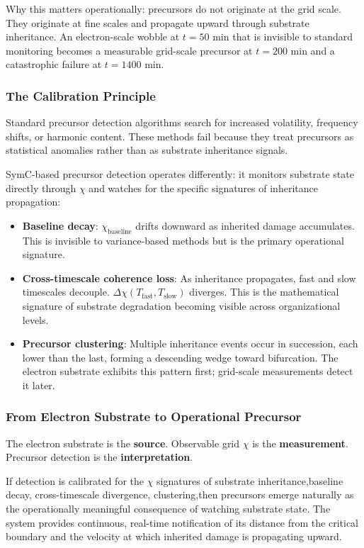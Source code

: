 \documentclass[11pt,letterpaper]{article}
\begin{document}
Why this matters operationally: precursors do not originate at the grid scale. They originate at fine scales and propagate upward through substrate inheritance. An electron-scale wobble at $t = 50$ min that is invisible to standard monitoring becomes a measurable grid-scale precursor at $t = 200$ min and a catastrophic failure at $t = 1400$ min.

\subsubsection{The Calibration Principle}

Standard precursor detection algorithms search for increased volatility, frequency shifts, or harmonic content. These methods fail because they treat precursors as statistical anomalies rather than as substrate inheritance signals.

SymC-based precursor detection operates differently: it monitors substrate state directly through $\chi$ and watches for the specific signatures of inheritance propagation:

\begin{itemize}
\item \textbf{Baseline decay}: $\chi_{\text{baseline}}$ drifts downward as inherited damage accumulates. This is invisible to variance-based methods but is the primary operational signature.
\item \textbf{Cross-timescale coherence loss}: As inheritance propagates, fast and slow timescales decouple. $\Delta\chi(T_{\text{fast}}, T_{\text{slow}})$ diverges. This is the mathematical signature of substrate degradation becoming visible across organizational levels.
\item \textbf{Precursor clustering}: Multiple inheritance events occur in succession, each lower than the last, forming a descending wedge toward bifurcation. The electron substrate exhibits this pattern first; grid-scale measurements detect it later.
\end{itemize}

\subsubsection{From Electron Substrate to Operational Precursor}

The electron substrate is the \textbf{source}. Observable grid $\chi$ is the \textbf{measurement}. Precursor detection is the \textbf{interpretation}.

If detection is calibrated for the $\chi$ signatures of substrate inheritance,baseline decay, cross-timescale divergence, clustering,then precursors emerge naturally as the operationally meaningful consequence of watching substrate state. The system provides continuous, real-time notification of its distance from the critical boundary and the velocity at which inherited damage is propagating upward.
\end{document}
